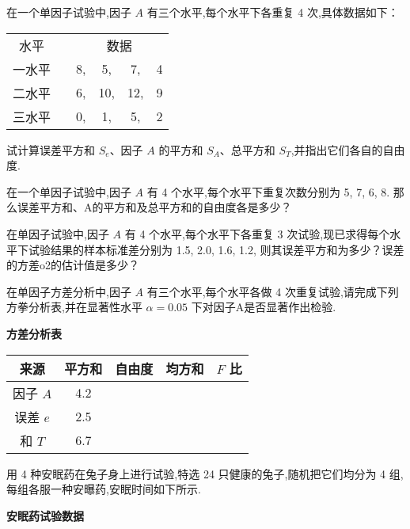 \begin{xiti}
    \item 在一个单因子试验中,因子 $A$ 有三个水平,每个水平下各重复 4 次,具体数据如下：
    \begin{center}
      \begin{tabular}{cccccc}
        水平    &       & \multicolumn{4}{c}{数据} \\
        一水平   &       & 8,    & 5,    & 7,    & 4 \\
        二水平   &       & 6,    & 10,   & 12,   & 9 \\
        三水平   &       & 0,    & 1,    & 5,    & 2 \\
      \end{tabular}%
    \end{center}
    试计算误差平方和 $S_e$、因子 $A$ 的平方和 $S_A$、总平方和 $S_T$,并指出它们各自的自由度.
    \item 在一个单因子试验中,因子 $A$ 有 4 个水平,每个水平下重复次数分别为 5, 7, 6, 8. 那么误差平方和、A的平方和及总平方和的自由度各是多少？
    \item 在单因子试验中,因子 $A$ 有 4 个水平,每个水平下各重复 3 次试验,现已求得每个水平下试验结果的样本标准差分别为 1.5, 2.0, 1.6, 1.2, 则其误差平方和为多少？误差的方差o2的估计值是多少？
    \item 在单因子方差分析中,因子 $A$ 有三个水平,每个水平各做 4 次重复试验,请完成下列方拳分析表,并在显著性水平 $\alpha=0.05$ 下对因子A是否显著作出检验.
    \begin{center}
      \textbf{方差分析表}\\
      \begin{tabular}{ccccc}
        \toprule
        来源    & 平方和 & 自由度 &均方和 & $F$ 比 \\
        \midrule
        因子 $A$   & 4.2   &       &       &  \\
        误差 $e$  & 2.5   &       &       &  \\
        和 $T$   & 6.7   &       &       &  \\
        \bottomrule
        \end{tabular}%
    \end{center}
    \item 用 4 种安眠药在兔子身上进行试验,特选 24 只健康的兔子,随机把它们均分为 4 组,每组各服一种安曝药,安眠时间如下所示.
    \begin{center}
      \textbf{安眠药试验数据}\\
    \begin{tabular}{lrrrrrr}

\end{tabular}
\end{center}
\end{xiti}
